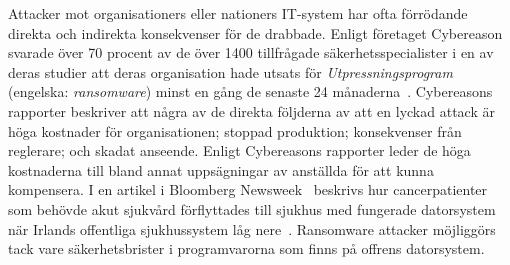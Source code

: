 Attacker mot organisationers eller nationers IT-system har ofta förrödande
direkta och indirekta konsekvenser för de drabbade. Enligt företaget Cybereason
svarade över 70 procent av de över 1400 tillfrågade säkerhetsspecialister i en
av deras studier att deras organisation hade utsats för
\emph{Utpressningsprogram} (engelska: \emph{ransomware}) minst en gång de senaste
24 månaderna~\cite{cyberreason2021, cyberreason2022}. Cybereasons rapporter
beskriver att några av de direkta följderna av att en lyckad attack är höga
kostnader för organisationen; stoppad produktion; konsekvenser från reglerare;
och skadat anseende. Enligt Cybereasons rapporter leder de höga kostnaderna till
bland annat uppsägningar av anställda för att kunna kompensera. I en artikel i
Bloomberg Newsweek~\cite{gallagher2023} beskrivs hur cancerpatienter som behövde
akut sjukvård förflyttades till sjukhus med fungerade datorsystem när Irlands
offentliga sjukhussystem låg nere~\cite{hse_report}. Ransomware attacker
möjliggörs tack vare säkerhetsbrister i programvarorna som finns på offrens
datorsystem.

